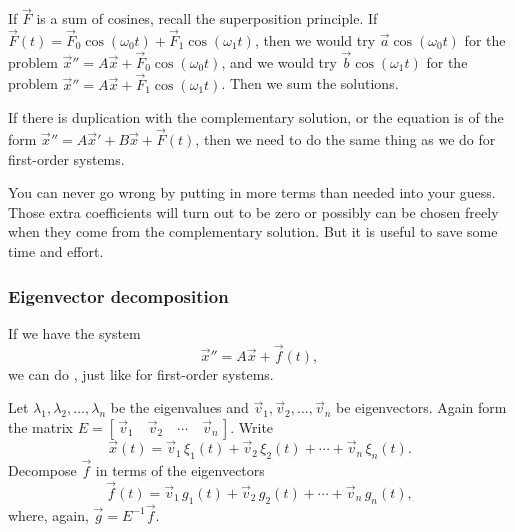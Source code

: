 If $\vec{F}$ is a sum of
cosines, recall the superposition principle.
If $\vec{F}(t) =
\vec{F}_0 \cos (\omega_0 t) + 
\vec{F}_1 \cos (\omega_1 t)$, then we would try
$\vec{a} \cos (\omega_0 t)$ for the problem
${\vec{x}}'' = A \vec{x} + \vec{F}_0 \cos (\omega_0 t)$, and we would try
$\vec{b} \cos (\omega_1 t)$ for the problem
${\vec{x}}'' = A \vec{x} + \vec{F}_1 \cos (\omega_1 t)$.  Then we sum the
solutions.

If there is duplication with the
complementary solution, or the equation is of the form
${\vec{x}}'' = A{\vec{x}}'+ B \vec{x} + \vec{F}(t)$, then we need
to do the same thing as we do for first-order systems.

You can never go wrong by putting in more terms than needed into
your guess.  Those extra coefficients will turn out to
be zero or possibly can be chosen freely when they come from the
complementary solution.
But it is useful to save some time and effort.

\subsubsection{Eigenvector decomposition}

If we have the system
\begin{equation*}
{\vec{x}}'' = A \vec{x} + \vec{f}(t) ,
\end{equation*}
we can do \emph{},
just like for first-order systems.

Let $\lambda_1, \lambda_2, \ldots, \lambda_n$ be the eigenvalues
and $\vec{v}_1, \vec{v}_2, \ldots, \vec{v}_n$ be eigenvectors.
Again form the matrix %
$E = [\, \vec{v}_1 \quad \vec{v}_2 \quad \cdots \quad \vec{v}_n \,]$.
Write
\begin{equation*}
\vec{x}(t) =
\vec{v}_1 \, \xi_1(t) + 
\vec{v}_2 \, \xi_2(t) + \cdots +
\vec{v}_n \, \xi_n(t) .
\end{equation*}
Decompose $\vec{f}$ in terms of the eigenvectors
\begin{equation*}
\vec{f}(t) =
\vec{v}_1 \, g_1(t) + 
\vec{v}_2 \, g_2(t) + \cdots +
\vec{v}_n \, g_n(t) ,
\end{equation*}
where, again, $\vec{g} = E^{-1} \vec{f}$.

